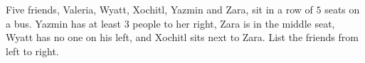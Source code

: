 Five friends, Valeria, Wyatt, Xochitl, Yazmin and Zara, sit in a row of $5$ seats on a bus. Yazmin has at least $3$ people to her right, Zara is in the middle seat, Wyatt has no one on his left, and Xochitl sits next to Zara. List the friends from left to right.
